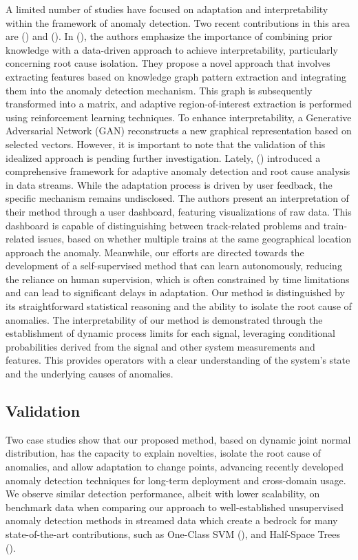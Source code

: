 A limited number of studies have focused on adaptation and interpretability within the framework of anomaly detection. Two recent contributions in this area are (\cite{Steenwinckel2018}) and (\cite{Steenwinckel2021}). In (\cite{Steenwinckel2018}), the authors emphasize the importance of combining prior knowledge with a data-driven approach to achieve interpretability, particularly concerning root cause isolation. They propose a novel approach that involves extracting features based on knowledge graph pattern extraction and integrating them into the anomaly detection mechanism. This graph is subsequently transformed into a matrix, and adaptive region-of-interest extraction is performed using reinforcement learning techniques. To enhance interpretability, a Generative Adversarial Network (GAN) reconstructs a new graphical representation based on selected vectors. However, it is important to note that the validation of this idealized approach is pending further investigation. Lately, (\cite{Steenwinckel2021}) introduced a comprehensive framework for adaptive anomaly detection and root cause analysis in data streams. While the adaptation process is driven by user feedback, the specific mechanism remains undisclosed. The authors present an interpretation of their method through a user dashboard, featuring visualizations of raw data. This dashboard is capable of distinguishing between track-related problems and train-related issues, based on whether multiple trains at the same geographical location approach the anomaly. Meanwhile, our efforts are directed towards the development of a self-supervised method that can learn autonomously, reducing the reliance on human supervision, which is often constrained by time limitations and can lead to significant delays in adaptation. Our method is distinguished by its straightforward statistical reasoning and the ability to isolate the root cause of anomalies. The interpretability of our method is demonstrated through the establishment of dynamic process limits for each signal, leveraging conditional probabilities derived from the signal and other system measurements and features. This provides operators with a clear understanding of the system's state and the underlying causes of anomalies.

\subsection{Validation}\label{par:validation}
Two case studies show that our proposed method, based on dynamic joint normal distribution, has the capacity to explain novelties, isolate the root cause of anomalies, and allow adaptation to change points, advancing recently developed anomaly detection techniques for long-term deployment and cross-domain usage. We observe similar detection performance, albeit with lower scalability, on benchmark data when comparing our approach to well-established unsupervised anomaly detection methods in streamed data which create a bedrock for many state-of-the-art contributions, such as One-Class SVM (\cite{Amer2013, Liu2014, Krawczyk2015, Miao2019, Gozuacik2021}), and Half-Space Trees (\cite{Wetzig2019, Lyu2020}).

